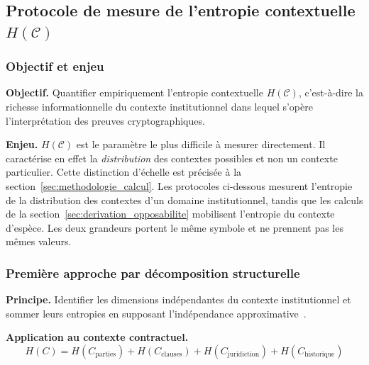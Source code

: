 \subsection{Protocole de mesure de l'entropie contextuelle $H(\mathcal{C})$}
\label{subsec:protocole_HC}
\begin{sloppypar}

\subsubsection{Objectif et enjeu}
\label{subsubsec:objectif_HC}

\noindent\textbf{Objectif.} Quantifier empiriquement l'entropie contextuelle
$H(\mathcal{C})$, c'est-\`a-dire la richesse informationnelle du contexte
institutionnel dans lequel s'op\`ere l'interpr\'etation des preuves
cryptographiques.

\noindent\textbf{Enjeu.} $H(\mathcal{C})$ est le param\`etre le plus difficile
\`a mesurer directement. Il caract\'erise en effet la \emph{distribution}
des contextes possibles et non un contexte particulier. Cette distinction
d'\'echelle est pr\'ecis\'ee \`a la
section~\ref{sec:methodologie_calcul}. Les protocoles ci-dessous mesurent
l'entropie de la distribution des contextes d'un domaine institutionnel,
tandis que les calculs de la section~\ref{sec:derivation_opposabilite}
mobilisent l'entropie du contexte d'esp\`ece. Les deux grandeurs portent le
m\^eme symbole et ne prennent pas les m\^emes valeurs.

\subsubsection{Premi\`ere approche par d\'ecomposition structurelle}
\label{subsubsec:approche_structurelle}

\noindent\textbf{Principe.} Identifier les dimensions ind\'ependantes du
contexte institutionnel et sommer leurs entropies en supposant
l'ind\'ependance approximative~\cite{MINKA2026CLO}.

\noindent\textbf{Application au contexte contractuel.}
\begin{equation}
H(C) = H(C_{\text{parties}}) + H(C_{\text{clauses}}) + H(C_{\text{juridiction}}) + H(C_{\text{historique}})
\label{eq:decomposition_HC}
\end{equation}


\end{sloppypar}
